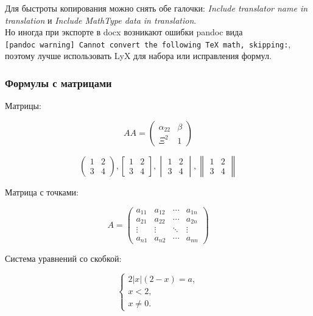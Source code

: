 \documentclass[
  a4paper,
]{book}
\theoremstyle{definition}
\theoremstyle{definition}
\theoremstyle{definition}
\theoremstyle{definition}
\theoremstyle{remark}
\begin{document}
Для быстроты копирования можно снять обе галочки: \emph{Include translator name in translation} и \emph{Include MathType data in translation}.\\
Но иногда при экспорте в docx возникают ошибки pandoc вида \texttt{{[}pandoc\ warning{]}\ Cannot\ convert\ the\ following\ TeX\ math,\ skipping:}, поэтому лучше использовать LyX для набора или исправления формул.

\hypertarget{markdown-syntax-math-matrix}{%
\subsubsection{Формулы с матрицами}\label{markdown-syntax-math-matrix}}

Матрицы:

\[AA = \begin{pmatrix} \alpha_{22} & \beta\\
 \Xi^2 & 1
\end{pmatrix}\]

\[\begin{pmatrix} 1 & 2 \\ 3 & 4 \end{pmatrix},
\begin{bmatrix} 1 & 2 \\ 3 & 4 \end{bmatrix},
\begin{vmatrix} 1 & 2 \\ 3 & 4 \end{vmatrix},
\begin{Vmatrix} 1 & 2 \\ 3 & 4 \end{Vmatrix}\]

Матрица с точками:

\[A = \begin{pmatrix}
a_{11} & a_{12} & \cdots & a_{1n} \\
a_{21} & a_{22} & \cdots & a_{2n} \\
\vdots & \vdots & \ddots & \vdots \\
a_{n1} & a_{n2} & \cdots & a_{nn}
\end{pmatrix}\]

Система уравнений со скобкой:

\begin{equation*}
 \begin{cases}
   2 |x|(2 - x) = a, \\
   x < 2, \\
   x \ne 0.
 \end{cases}
\end{equation*}
\end{document}
